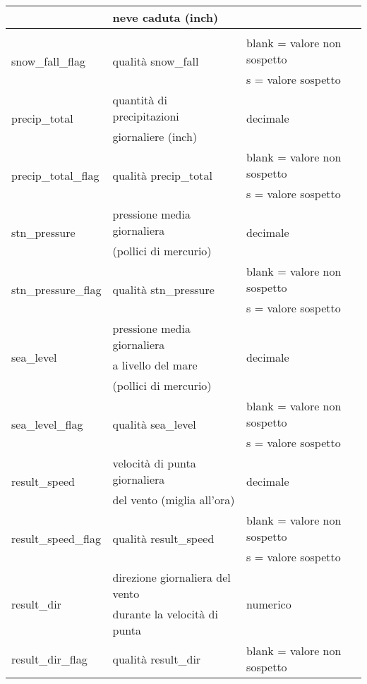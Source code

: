 \begin{longtable}{lll}
	& neve caduta (inch) &\\
	\hline	
	\\ %
	\hline
	\multirow{2}{*}{snow\_fall\_flag}		& \multirow{2}{*}{qualità snow\_fall} &  blank = valore non sospetto \\
	& & s = valore sospetto			 \\ 
	\hline
	\multirow{2}{*}{precip\_total}		& quantità di precipitazioni 	 & 
	\multirow{2}{*}{decimale}			\\ 
	& giornaliere (inch) &\\\hline	
	\multirow{2}{*}{precip\_total\_flag}		& \multirow{2}{*}{qualità precip\_total} &  blank = valore non sospetto \\
	& & s = valore sospetto			 \\ 
	\hline	
	\multirow{2}{*}{stn\_pressure}		& pressione media giornaliera	 & 	
	\multirow{2}{*}{decimale}		\\ 
	&   (pollici di mercurio) &\\
	\hline	
	\multirow{2}{*}{stn\_pressure\_flag}		& \multirow{2}{*}{qualità stn\_pressure} &  blank = valore non sospetto \\
	& & s = valore sospetto			 \\ 
	\hline	
	\multirow{3}{*}{sea\_level}			& pressione media giornaliera 	 & 	
	\multirow{3}{*}{decimale}		\\ 
	& a livello del mare &\\
	& (pollici di mercurio)&\\
	\hline	
	\multirow{2}{*}{sea\_level\_flag}		& \multirow{2}{*}{qualità sea\_level} &  blank = valore non sospetto \\
	& & s = valore sospetto			 \\ 
	\hline
	\multirow{2}{*}{result\_speed}		& velocità di punta giornaliera 	 & 	\multirow{2}{*}{decimale}	\\ 
	& del vento (miglia all'ora) &\\
	\hline	
	\multirow{2}{*}{result\_speed\_flag}		& \multirow{2}{*}{qualità result\_speed} &  blank = valore non sospetto \\
	& & s = valore sospetto			 \\ 
	\hline	
	\multirow{2}{*}{result\_dir}			& direzione giornaliera del vento  & 	\multirow{2}{*}{numerico}	\\ 
	& durante la velocità di punta &\\
	\hline	
	\multirow{2}{*}{result\_dir\_flag}		& \multirow{2}{*}{qualità result\_dir} &  blank = valore non sospetto \\

\end{longtable}
